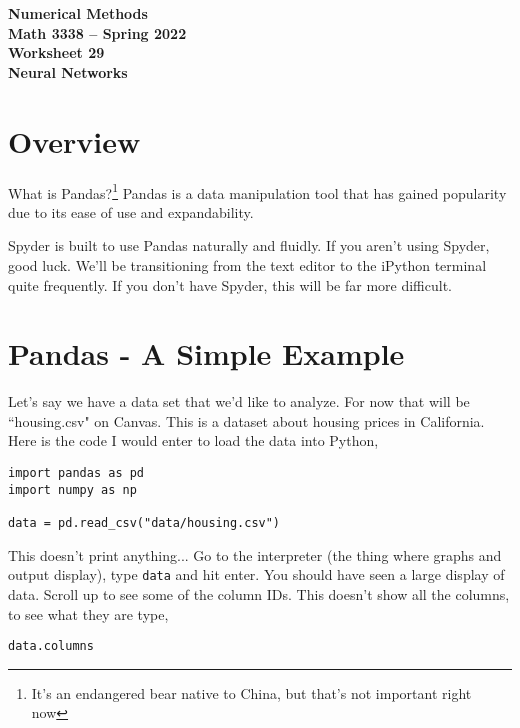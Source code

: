 \documentclass[11pt,letterpaper]{article}
\newcommand{\semester}{Spring 2022}
\begin{document}
\begin{center}
{\huge{\bf  Numerical Methods}} \\[1.5ex]
{\bf Math 3338 -- \semester}\\[1.5ex]
{\Large{\bf Worksheet 29\ \\[2ex] Neural Networks}}\\
\end{center}
\vspace{2mm}





\section{Overview}

What is Pandas?\footnote{It's an endangered bear native to China, but that's not important right
now} Pandas is a data manipulation tool that has gained popularity due to its ease of use and 
expandability.

Spyder is built to use Pandas naturally and fluidly. If you aren't using Spyder, good luck. We'll
be transitioning from the text editor to the iPython terminal quite frequently. If you don't have
Spyder, this will be far more difficult. 



\section{Pandas - A Simple Example}
Let's say we have a data set that we'd like to analyze. For now that will be ``housing.csv" on
Canvas. This is a dataset about housing prices in California.  Here is the code I would enter to 
load the data into Python,
\begin{verbatim}
import pandas as pd
import numpy as np

data = pd.read_csv("data/housing.csv")
\end{verbatim}
This doesn't print anything... Go to the interpreter (the thing where graphs and output display),
type \texttt{data} and hit enter. You should have seen a large display of data. Scroll up to see
some of the column IDs. This doesn't show all the columns, to see what they are type,
\begin{verbatim}
data.columns
\end{verbatim}
\end{document}
